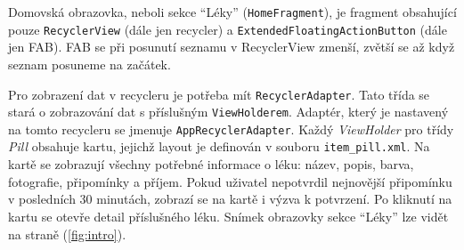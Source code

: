 \documentclass[../TakeYourPill.tex]{subfiles}
\begin{document}
Domovská obrazovka, neboli sekce \enquote{Léky} (\texttt{HomeFragment}), je fragment obsahující pouze \texttt{RecyclerView} (dále jen recycler) a \texttt{ExtendedFloatingActionButton} (dále jen FAB). FAB se při posunutí seznamu v RecyclerView zmenší, zvětší se až když seznam posuneme na začátek. 

Pro zobrazení dat v recycleru je potřeba mít \texttt{RecyclerAdapter}. Tato třída se stará o zobrazování dat s příslušným \texttt{ViewHolderem}. Adaptér, který je nastavený na tomto recycleru se jmenuje \texttt{AppRecyclerAdapter}. Každý \emph{ViewHolder} pro třídy \emph{Pill} obsahuje kartu, jejichž layout je definován v souboru \texttt{item\_pill.xml}. Na kartě se zobrazují všechny potřebné informace o léku: název, popis, barva, fotografie, připomínky a příjem. Pokud uživatel nepotvrdil nejnovější připomínku v posledních 30 minutách, zobrazí se na kartě i výzva k potvrzení. Po kliknutí na kartu se otevře detail příslušného léku. Snímek obrazovky sekce \enquote{Léky} lze vidět na straně \pageref{fig:intro} (\ref{fig:intro}).



\end{document}
